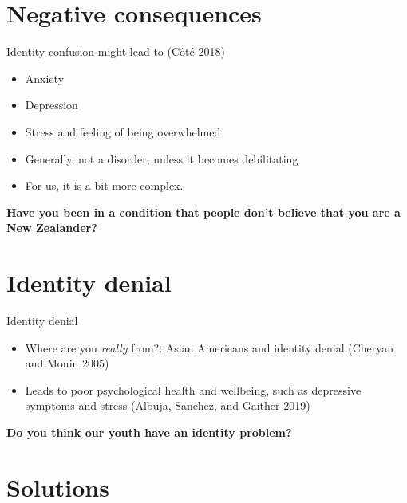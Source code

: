 \documentclass[
  ignorenonframetext,
  aspectratio=169,
]{beamer}
\providecommand{\tightlist}{%
  \setlength{\itemsep}{0pt}\setlength{\parskip}{0pt}}\usepackage{longtable,booktabs,array}
\begin{document}
\section{Negative consequences}\label{negative-consequences}

\begin{frame}{Identity confusion might lead to}
\label{identity-confusion-might-lead-to}
(Côté 2018)

\begin{itemize}[<+->]
\tightlist
\item
  Anxiety
\item
  Depression
\item
  Stress and feeling of being overwhelmed
\item
  Generally, not a disorder, unless it becomes debilitating
\item
  For us, it is a bit more complex.
\end{itemize}
\end{frame}

\begin{frame}
\textbf{Have you been in a condition that people don't believe that you
are a New Zealander?}
\end{frame}

\section{Identity denial}\label{identity-denial}

\begin{frame}{Identity denial}
\label{identity-denial-1}
\begin{itemize}[<+->]
\tightlist
\item
  Where are you \emph{really} from?: Asian Americans and identity denial
  (Cheryan and Monin 2005)
\item
  Leads to poor psychological health and wellbeing, such as depressive
  symptoms and stress (Albuja, Sanchez, and Gaither 2019)
\end{itemize}
\end{frame}

\begin{frame}
\textbf{Do you think our youth have an identity problem?}
\end{frame}

\section{Solutions}\label{solutions}
\end{document}
